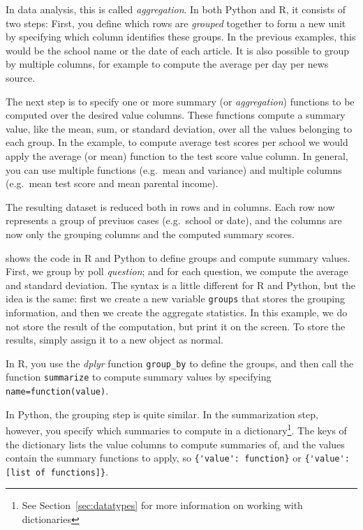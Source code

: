 In data analysis, this is called \emph{aggregation}.
In both Python and R, it consists of two steps:
First, you define which rows are \emph{grouped} together to form a new unit
by specifying which column identifies these groups.
In the previous examples, this would be the school name or the date of each article.
It is also possible to group by multiple columns, for example to compute the average per day per news source.

The next step is to specify one or more summary (or \emph{aggregation}) functions to be computed over the desired value columns.
These functions compute a summary value, like the mean, sum, or standard deviation, over all the values belonging to each group.
In the example, to compute average test scores per school we would apply the average (or mean) function to the test score value column.
In general, you can use multiple functions (e.g.\  mean and variance) and multiple columns (e.g.\ mean test score and mean parental income).

The resulting dataset is reduced both in rows and in columns.
Each row now represents a group of previuos cases (e.g.\ school or date),
and the columns are now only the grouping columns and the computed summary scores.

 shows the code in R and Python to define groups and compute summary values.
First, we group by poll \emph{question}; and for each question, we compute the average and standard deviation.
The syntax is a little different for R and Python, but the idea is the same:
first we create a new variable \verb+groups+ that stores the grouping information,
and then we create the aggregate statistics.
In this example, we do not store the result of the computation, but print it on the screen.
To store the results, simply assign it to a new object as normal.


In R, you use the \emph{dplyr} function \texttt{group\_by}  to define the groups,
and then call the function \texttt{summarize} to compute summary values by specifying
\verb+name=function(value)+.

In Python, the grouping step is quite similar.
In the summarization step, however, you specify which summaries to compute in a dictionary\footnote{See Section~\ref{sec:datatypes} for more information on working with dictionaries}.
The keys of the dictionary lists the value columns to compute summaries of,
and the values contain the summary functions to apply, so  \verb+{'value': function}+ or \verb+{'value': [list of functions]}+.

